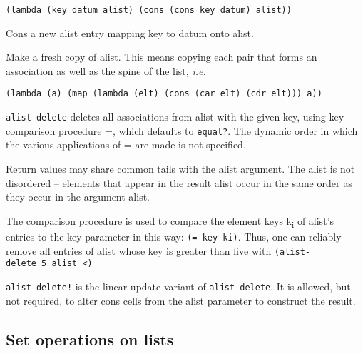 \begin{entry}{%
  }

\begin{verbatim}
(lambda (key datum alist) (cons (cons key datum) alist))
\end{verbatim}

  Cons a new alist entry mapping key to  datum onto
  alist.
\end{entry}

\begin{entry}{%
  } 

  Make a fresh
  copy of alist. This means copying each pair that forms an
  association as well as the spine of the list, \emph{i.e.}

\begin{verbatim}
(lambda (a) (map (lambda (elt) (cons (car elt) (cdr elt))) a))
\end{verbatim}
\end{entry}

\begin{entry}{%
  }

  \texttt{alist-delete} deletes all associations from alist with the
  given key, using key-comparison procedure =, which defaults to
  \texttt{equal?}. The dynamic order in which the various applications
  of = are made is not specified.

  Return values may share common tails with the alist argument. The
  alist is not disordered -- elements that appear in the result alist
  occur in the same order as they occur in the argument alist.

  The comparison procedure is used to compare the element keys
  k\textsubscript{i} of alist's entries to the key parameter in this
  way: \texttt{(=\ key\ ki)}. Thus, one can reliably remove all
  entries of alist whose key is greater than five with
  \texttt{(alist-delete\ 5\ alist\ \textless{})}

  \texttt{alist-delete!} is the linear-update variant of
  \texttt{alist-delete}. It is allowed, but not required, to alter
  cons cells from the alist parameter to construct the result.
\end{entry}

\subsection{{Set operations on lists}}


